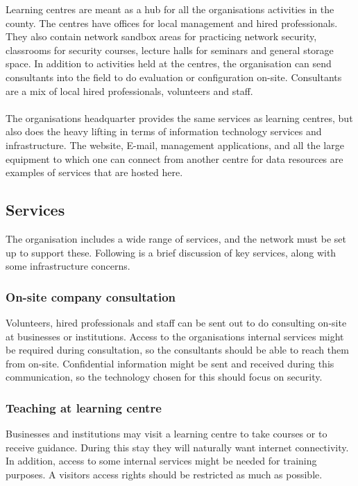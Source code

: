 Learning centres are meant as a hub for all the organisations activities in the county. The centres have offices for local management and hired professionals. They also contain network sandbox areas for practicing network security, classrooms for security courses, lecture halls for seminars and general storage space. In addition to activities held at the centres, the organisation can send consultants into the field to do evaluation or configuration on-site. Consultants are a mix of local hired professionals, volunteers and staff.
\\
\\
The organisations headquarter provides the same services as learning centres, but also does the heavy lifting in terms of information technology services and infrastructure. The website, E-mail, management applications, and all the large equipment to which one can connect from another centre for data resources are examples of services that are hosted here.

\subsection{Services}

The organisation includes a wide range of services, and the network must be set up to support these. Following is a brief discussion of key services, along with some infrastructure concerns.


\subsubsection{On-site company consultation}

Volunteers, hired professionals and staff  can be sent out to do consulting on-site at businesses or institutions. Access to the organisations internal services might be required during consultation, so the consultants should be able to reach them from on-site. Confidential information might be sent and received during this communication, so the technology chosen for this should focus on security.

\subsubsection{Teaching at learning centre}

Businesses and institutions may visit a learning centre to take courses or to receive guidance. During this stay they will naturally want internet connectivity. In addition, access to some internal services might be needed for training purposes. A visitors access rights should be restricted as much as possible.

